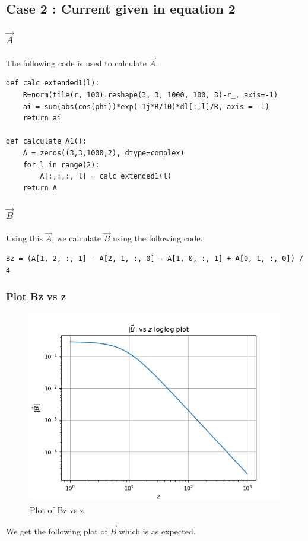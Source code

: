 \documentclass[11pt, a4paper]{article}
\begin{document}
\newpage
\subsection{Case 2 : Current given in equation 2}
\subsubsection{$\vec{A}$}
The following code is used to calculate $\vec{A}$.\\
\begin{lstlisting}
def calc_extended1(l):
	R=norm(tile(r, 100).reshape(3, 3, 1000, 100, 3)-r_, axis=-1)   
	ai = sum(abs(cos(phi))*exp(-1j*R/10)*dl[:,l]/R, axis = -1)
	return ai

def calculate_A1():
	A = zeros((3,3,1000,2), dtype=complex)
	for l in range(2):
		A[:,:,:, l] = calc_extended1(l)
	return A

\end{lstlisting}
\subsubsection{$\vec{B}$}
Using this $\vec{A}$, we calculate $\vec{B}$ using the following code.
\begin{lstlisting}
Bz = (A[1, 2, :, 1] - A[2, 1, :, 0] - A[1, 0, :, 1] + A[0, 1, :, 0]) / 4
\end{lstlisting}

\subsubsection{Plot Bz vs z}
\begin{figure}[!tbh]
   	\centering
   	\includegraphics[scale=0.5]{fig5.png}  %
   	\caption{Plot of Bz vs z.}
   	\label{fig:sample}
   \end{figure}
We get the following plot of $\vec{B}$ which is as expected.
\end{document}
